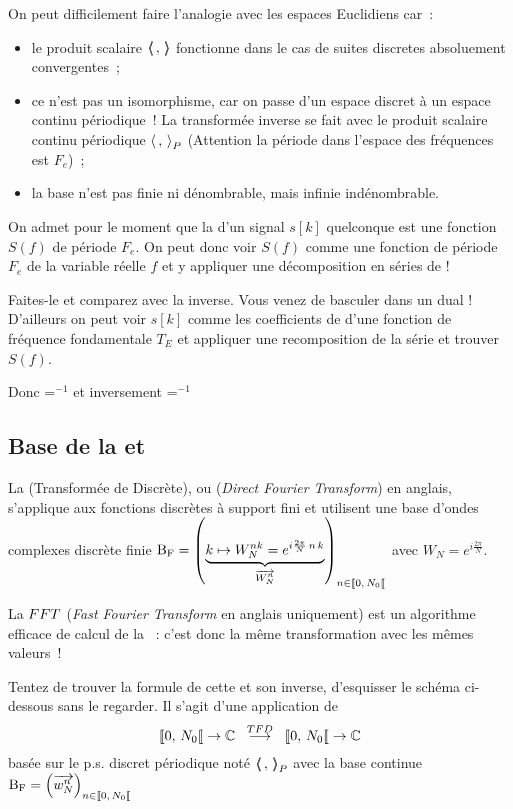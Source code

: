 

On peut difficilement faire l'analogie avec les espaces Euclidiens
car~:
\begin{itemize}
\item le produit scalaire $\langle\!\!\langle\,,\,\rangle\!\!\rangle$ fonctionne dans le cas de
  suites discretes absoluement convergentes~;
\item ce n'est pas un isomorphisme, car on passe d'un espace discret à
  un espace continu périodique~! La transformée inverse se fait avec
  le produit scalaire continu périodique $\langle\,,\,{\rangle}_P$ (Attention la
  période dans l'espace des fréquences est $F_e$)~;
\item la base n'est pas finie ni dénombrable, mais infinie
  indénombrable.
\end{itemize}


\begin{exercice}
  On admet pour le moment que la \TFSD{} d'un signal $s[k]$ quelconque
  est une fonction $S(f)$ de période $F_e$. On peut donc voir $S(f)$
  comme une fonction de période $F_e$ de la variable réelle $f$ et y
  appliquer une décomposition en séries de \Fourier{}!

  Faites-le et comparez avec la \TFSD{} inverse. Vous venez de
  basculer dans un dual ! D'ailleurs on peut voir $s[k]$ comme les
  coefficients de \Fourier{} d'une fonction de fréquence fondamentale
  $T_E$ et appliquer une recomposition de la série et trouver $S(f)$.

  Donc \TFSD{}=\sdf{}$^{-1}$ et inversement \sdf{}=\TFSD{}$^{-1}$
\end{exercice}

\subsection{Base de la \TFD{} et \FFT}

La \TFD{} (Transformée de \Fourier{} Discrète), ou \DFT{}
(\emph{Direct Fourier Transform}) en anglais, s'applique aux fonctions
discrètes à support fini et utilisent une base d'ondes complexes
discrète finie
$\Bf=\p{\caCest{k\mapsto W_N^{nk}=e^{i \frac{2
        \pi}{N}\,n\,k}}{\vec{W_N^{n}}}}_{n\in\SN0}$ avec
$W_N=e^{i \frac{2 \pi}{N}}$.

La $FFT{}$ (\emph{Fast Fourier Transform} en anglais uniquement) est
un algorithme efficace de calcul de la \TFD{}~: c'est donc la même
transformation avec les mêmes valeurs~!

\begin{exercice}
  Tentez de trouver la formule de cette \TFD{} et son inverse,
  d'esquisser le schéma ci-dessous sans le regarder. Il s'agit d'une
  application
  de $$\SN0\rightarrow\C\;\;\operateur{\TFD}\;\;\SN0\rightarrow\C$$
  basée sur le p.s. discret périodique noté $\langle\!\!\langle\,,\,{\rangle\!\!\rangle}_P$ avec la base
  continue $\Bf=\p{\vec{w_N^{n}}}_{n\in\SN0}$
\end{exercice}

